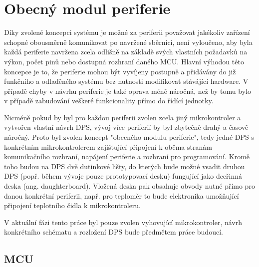 \section{Obecný modul periferie}


    Díky zvolené koncepci systému je možné za periferii považovat jakékoliv zařízení schopné obousměrně komunikovat po navržené sběrnici, není vyloučeno, aby byla každá periferie navržena zcela odlišně na základě svých vlastních požadavků na výkon, počet pinů nebo dostupná rozhraní daného MCU. Hlavní výhodou této koncepce je to, že periferie mohou být vyvíjeny postupně a přidávány do již funkčního a odladěného systému bez nutnosti modifikovat stávájící hardware. V případě chyby v návrhu periferie je také oprava méně náročná, než by tomu bylo v případě zabudování veškeré funkcionality přímo do řídící jednotky. 

    Nicméně pokud by byl pro každou periferii zvolen zcela jiný mikrokontroler a vytvořen vlastní návrh DPS, vývoj více periferií by byl zbytečně drahý a časově náročný. Proto byl zvolen koncept "obecného modulu periferie", tedy jedné DPS s konkrétním mikrokontrolerem zajišťující připojení k oběma stranám komunikačního rozhraní, napájení periferie a rozhraní pro programování. Kromě toho budou na DPS dvě dutinkové lišty, do kterých bude možné vsadit druhou DPS (popř. během vývoje pouze prototypovací desku) fungující jako dceřinná deska (ang. daughterboard). Vložená deska pak obsahuje obvody nutné přímo pro danou konkrétní periferii, např. pro teploměr to bude elektronika umožňující připojení teplotního čidla k mikrokontroleru. 

    V aktuální fázi tento práce byl pouze zvolen vyhovující mikrokontroler, návrh konkrétního schématu a rozložení DPS bude předmětem práce budoucí. 
    
    \subsection{MCU}

